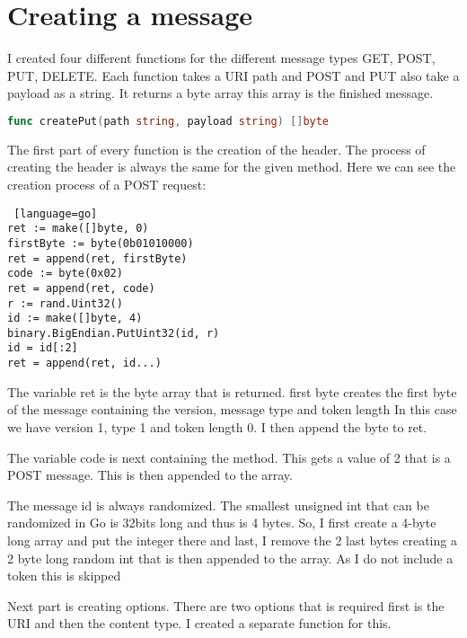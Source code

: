 \documentclass{article}
\title{\gettitle}
\author{\getauthor}
\date{\daymonthyear\today} %
\newcommand{\getauthor}{Elias Berglin} %
\newcommand{\gettitle}{COAP implementation} %
\begin{document}
    \maketitle
    \newpage

    \fancyhf{}
    \lhead{\getauthor}
    \rhead{\gettitle}
    \rfoot \thepage

    \section{Creating a message}
    I created four different functions for the different message types GET, POST, PUT, DELETE.
    Each function takes a URI path and POST and PUT also take a payload as a string. It returns a byte array
    this array is the finished message. 
    \begin{lstlisting}[language=go]
func createPut(path string, payload string) []byte
    \end{lstlisting}
    The first part of every function is the creation of the header.
    The process of creating the header is always the same for the given method.
    Here we can see the creation process of a POST request:
    \begin{lstlisting} [language=go]
ret := make([]byte, 0)
firstByte := byte(0b01010000)
ret = append(ret, firstByte)
code := byte(0x02)
ret = append(ret, code)
r := rand.Uint32()
id := make([]byte, 4)
binary.BigEndian.PutUint32(id, r)
id = id[:2]
ret = append(ret, id...)
    \end{lstlisting}
    The variable ret is the byte array that is returned. 
    first byte creates the first byte of the message containing the version, message type and token length
    In this case we have version 1, type 1 and token length 0.
    I then append the byte to ret.

    The variable code is next containing the method. This gets a value of 2 that is a POST message.
    This is then appended to the array.

    The message id is always randomized. The smallest unsigned int that can be randomized in Go is 32bits
    long and thus is 4 bytes. So, I first create a 4-byte long array and put the integer there and last, I remove the 2 last bytes
    creating a 2 byte long random int that is then appended to the array.
    As I do not include a token this is skipped

    Next part is creating options. There are two options that is required first is the URI and then the content type. I created a separate function for this.
\end{document}
